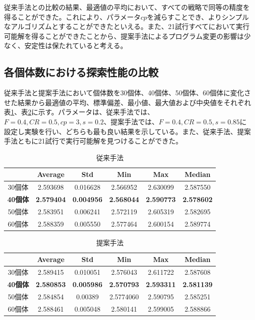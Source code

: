 \documentclass[a4paper,12pt]{jsreport}
\begin{document}
従来手法との比較の結果、最適値の平均において、すべての戦略で同等の精度を得ることができた。これにより、パラメータ$cp$を減らすことでき、よりシンプルなアルゴリズムとすることができたといえる。また、21試行すべてにおいて実行可能解を得ることができたことから、提案手法によるプログラム変更の影響は少なく、安定性は保たれていると考える。


\subsection{各個体数における探索性能の比較}
従来手法と提案手法において個体数を30個体、40個体、50個体、60個体に変化させた結果から最適値の平均、標準偏差、最小値、最大値および中央値をそれぞれ表\ref{tbl:個体数従来}、表\ref{tbl:個体数提案}に示す。パラメータは、従来手法では、$F=0.4,CR=0.5,cp=3,s=0.2$、提案手法では、$F=0.4,CR=0.5,s=0.85$に設定し実験を行い、どちらも最も良い結果を示している。また、従来手法、提案手法ともに21試行で実行可能解を見つけることができた。
\begin{table}[htbp]
\begin{center}
\caption{従来手法}
\label{tbl:個体数従来}
\begin{tabular}{|c|c|c|c|c|c|}
\hline
      & Average & Std & Min & Max & Median  \\ \hline
30個体 & 2.593698	& 0.016628 & 2.566952 & 2.630099 & 2.587550\\ \hline
\bf40個体 & \bf2.579404 & \bf0.004956 & \bf2.568044 & \bf2.590773 & \bf2.578602\\ \hline
50個体 & 2.583951 & 0.006241 & 2.572119 & 2.605319 & 2.582695\\ \hline
60個体 & 2.588359 & 0.005550 & 2.577464 & 2.600154 & 2.589774\\ \hline
\end{tabular}
\end{center}
\end{table}

\begin{table}[htbp]
\begin{center}
\caption{提案手法}
\label{tbl:個体数提案}
\begin{tabular}{|c|c|c|c|c|c|}
\hline
      & Average & Std & Min & Max & Median  \\ \hline
30個体 & 2.589415	& 0.010051 & 2.576043 & 2.611722 & 2.587608\\ \hline
\bf40個体 & \bf2.580853 & \bf0.005986 & \bf2.570793 & \bf2.593311 & \bf2.581139\\ \hline
50個体 & 2.584854 & 0.00389 & 2.5774060 & 2.590795 & 2.585251\\ \hline
60個体 & 2.588461 & 0.005048 & 2.580141 & 2.599005 & 2.588866\\ \hline
\end{tabular}
\end{center}
\end{table}
\end{document}
